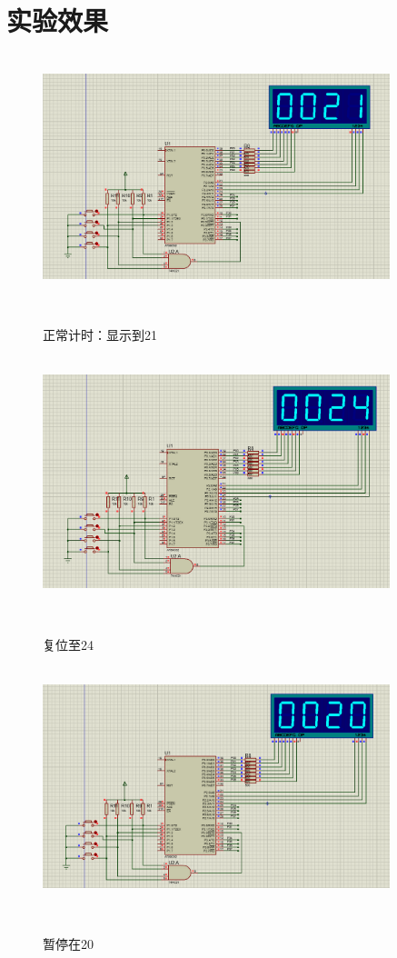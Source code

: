 \documentclass[12pt,hyperref,a4paper,UTF8]{ctexart}
\begin{document}
\section{实验效果}

\begin{figure}[H] %
    \centering
    \includegraphics[width=0.9\textwidth]{figures/201.png} %
    \caption{正常计时：显示到21 } %
    \label{fig:example} %
\end{figure}

\begin{figure}[H] %
    \centering
    \includegraphics[width=0.9\textwidth]{figures/202.png} %
    \caption{复位至24} %
    \label{fig:example} %
\end{figure}

\begin{figure}[H] %
    \centering
    \includegraphics[width=0.9\textwidth]{figures/203.png} %
    \caption{暂停在20 } %
    \label{fig:example} %
\end{figure}
\end{document}
